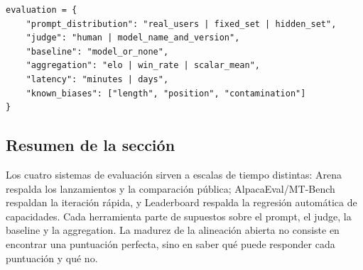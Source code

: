 
\begin{lstlisting}[caption={Estructura mínima de registro de un portfolio de evaluación}]
evaluation = {
    "prompt_distribution": "real_users | fixed_set | hidden_set",
    "judge": "human | model_name_and_version",
    "baseline": "model_or_none",
    "aggregation": "elo | win_rate | scalar_mean",
    "latency": "minutes | days",
    "known_biases": ["length", "position", "contamination"]
}
\end{lstlisting}

\subsection{Resumen de la sección}

Los cuatro sistemas de evaluación sirven a escalas de tiempo distintas: Arena respalda los lanzamientos y la comparación pública; AlpacaEval/MT-Bench respaldan la iteración rápida, y Leaderboard respalda la regresión automática de capacidades. Cada herramienta parte de supuestos sobre el prompt, el judge, la baseline y la aggregation. La madurez de la alineación abierta no consiste en encontrar una puntuación perfecta, sino en saber qué puede responder cada puntuación y qué no.
